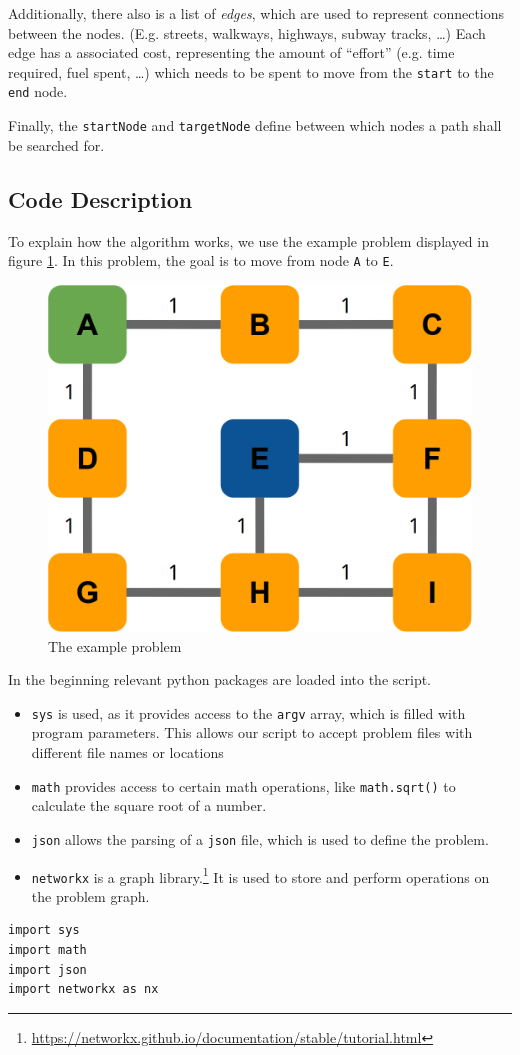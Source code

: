 \documentclass[12pt]{article}
\begin{document}
Additionally, there also is a list of \textit{edges}, which are used to represent connections between the nodes.
(E.g. streets, walkways, highways, subway tracks, \ldots)
Each edge has a associated cost, representing the amount of \enquote{effort} (e.g. time required, fuel spent, \ldots) which needs to be spent to move from the \texttt{start} to the \texttt{end} node.

Finally, the \texttt{startNode} and \texttt{targetNode} define between which nodes a path shall be searched for.


\subsection{Code Description}
To explain how the algorithm works, we use the example problem displayed in figure \ref{fig:ex1}.
In this problem, the goal is to move from node \texttt{A} to \texttt{E}.
\begin{figure}[H]
	\centering
	\includegraphics[width=0.7\linewidth]{sources/ex1}
	\caption{The example problem}
	\label{fig:ex1}
\end{figure}


In the beginning relevant python packages are loaded into the script.
\begin{itemize}
	\item \texttt{sys} is used, as it provides access to the \texttt{argv} array, which is filled with program parameters. This allows our script to accept problem files with different file names or locations
	\item \texttt{math} provides access to certain math operations, like \texttt{math.sqrt()} to calculate the square root of a number.
	\item \texttt{json} allows the parsing of a \texttt{json} file, which is used to define the problem.
	\item \texttt{networkx} is a graph library.\footnote{\url{https://networkx.github.io/documentation/stable/tutorial.html}} It is used to store and perform operations on the problem graph.
\end{itemize}
\begin{lstlisting}
import sys
import math
import json
import networkx as nx
\end{lstlisting}
\end{document}
